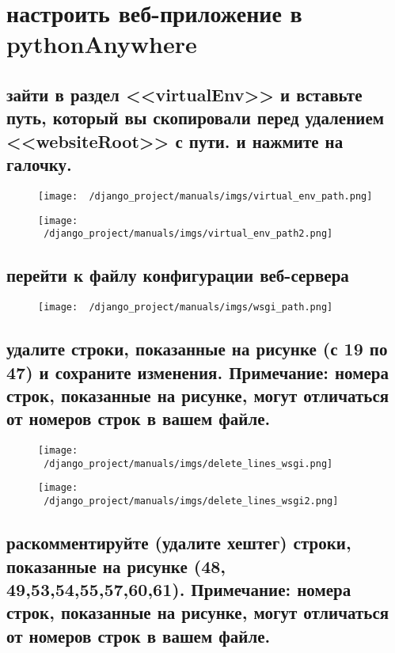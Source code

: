 \documentclass[12pt]{article}
\begin{document}
  \section{настроить веб-приложение в pythonAnywhere}

  \subsection{зайти в раздел <<virtualEnv>> и вставьте путь, который вы скопировали перед удалением <<websiteRoot>> с пути. и нажмите на галочку.}
	\begin{figure}[H]
		\centering
		\texttt{[image: ~/django\_project/manuals/imgs/virtual\_env\_path.png]}
		\caption{}
	\end{figure}
	\begin{figure}[H]
		\centering
		\texttt{[image: ~/django\_project/manuals/imgs/virtual\_env\_path2.png]}
		\caption{}
	\end{figure}

  \subsection{перейти к файлу конфигурации веб-сервера}
	\begin{figure}[H]
		\centering
		\texttt{[image: ~/django\_project/manuals/imgs/wsgi\_path.png]}
		\caption{}
	\end{figure}



  \subsection{удалите строки, показанные на рисунке (с 19 по 47) и сохраните изменения.
  Примечание: номера строк, показанные на рисунке, могут отличаться от номеров строк в вашем файле.}
	\begin{figure}[H]
		\centering
		\texttt{[image: ~/django\_project/manuals/imgs/delete\_lines\_wsgi.png]}
		\caption{}
	\end{figure}
	\begin{figure}[H]
		\centering
		\texttt{[image: ~/django\_project/manuals/imgs/delete\_lines\_wsgi2.png]}
		\caption{}
	\end{figure}


  \subsection{раскомментируйте (удалите хештег) строки, показанные на рисунке (48, 49,53,54,55,57,60,61).
  Примечание: номера строк, показанные на рисунке, могут отличаться от номеров строк в вашем файле.}
\end{document}
